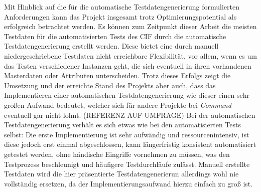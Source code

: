 Mit Hinblick auf die für die automatische Testdatengenerierung formulierten Anforderungen kann das Projekt insgesamt trotz Optimierungspotential als erfolgreich betrachtet werden. Es können zum Zeitpunkt dieser Arbeit die meisten Testdaten für die automatisierten Tests des \ac{CIF} durch die automatische Testdatengenerierung erstellt werden. Diese bietet eine durch manuell niedergeschriebene Testdaten nicht erreichbare Flexibilität, vor allem, wenn es um das Testen verschiedener Instanzen geht, die sich eventuell in ihren vorhandenen Masterdaten oder Attributen unterscheiden. Trotz dieses Erfolgs zeigt die Umsetzung und der erreichte Stand des Projekts aber auch, dass das Implementieren einer automatischen Testdatengenerierung wie dieser einen sehr großen Aufwand bedeutet, welcher sich für andere Projekte bei \textit{Command} eventuell gar nicht lohnt. (REFERENZ AUF UMFRAGE) Bei der automatischen Testdatengenerierung verhält es sich etwas wie bei den automatisierten Tests selbst: Die erste Implementierung ist sehr aufwändig und ressourcenintensiv, ist diese jedoch erst einmal abgeschlossen, kann längerfristig konsistent automatisiert getestet werden, ohne händische Eingriffe vornehmen zu müssen, was den Testprozess beschleunigt und häufigere Testdurchläufe zulässt. Manuell erstellte Testdaten wird die hier präsentierte Testdatengenerierun allerdings wohl nie vollständig ersetzen, da der Implementierungsaufwand hierzu einfach zu groß ist.